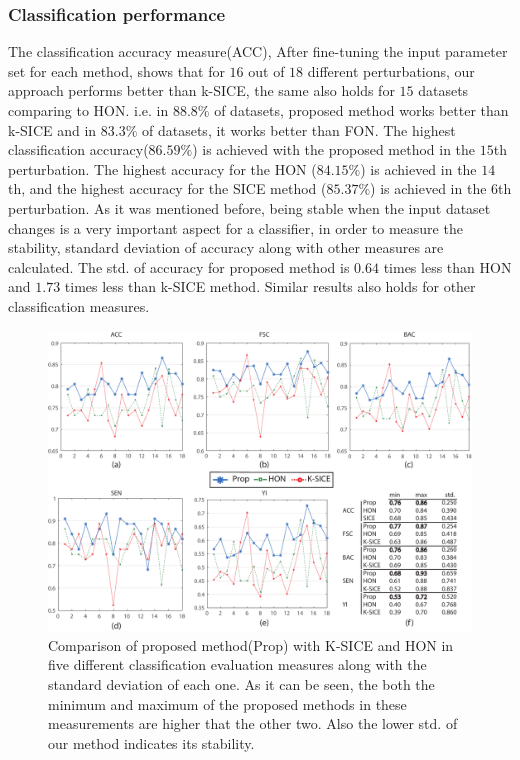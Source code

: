 \documentclass[preprint,12pt]{elsarticle}
\begin{document}
\subsubsection{Classification performance}
The classification accuracy measure(ACC), After fine-tuning the input parameter set for each method, shows that for $16$ out of $18$ different perturbations, our approach performs better than k-SICE, the same also holds for $15$ datasets comparing to HON. i.e. in $88.8 \%$ of datasets, proposed method works better than k-SICE and in $83.3 \%$ of datasets, it works better than FON.  
The highest classification accuracy($86.59\%$) is achieved with the proposed method in the $15$th perturbation. The highest accuracy for the HON ($84.15\%$) is achieved in the $14$th, and the highest accuracy for the SICE method ($85.37\%$) is achieved in the $6$th perturbation. As it was mentioned before, being stable when the input dataset changes is a very important aspect for a classifier, in order to measure the stability, standard deviation of accuracy along with other measures are
calculated. The std. of accuracy for proposed method is $0.64$ times less than HON and $1.73$ times less than k-SICE method. Similar results also holds for other classification measures.
\begin{figure}
	\centering
	\includegraphics[width=6in]{images/Final-eps.pdf}
	\caption{
		Comparison of proposed method(Prop) with K-SICE and HON in five different classification evaluation measures along with the standard deviation of each one. As it can be seen, the both the minimum and maximum of the proposed methods in these measurements are higher that the other two. Also the lower std. of our method indicates its stability.   
	}
	\label{g3.2}
\end{figure}
\end{document}

